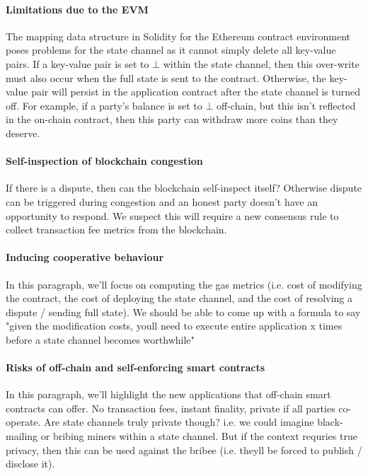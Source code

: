 \documentclass{llncs}
\begin{document}
	\paragraph{Limitations due to the EVM} 
	The mapping data structure in Solidity for the Ethereum contract environment poses problems for the state channel as it cannot simply delete all key-value pairs.
	If a key-value pair is set to $\bot$ within the state channel, then this over-write must also occur when the full state is sent to the contract. 
	Otherwise, the key-value pair will persist in the application contract after the state channel is turned off.
	For example, if a party's balance is set to $\bot$ off-chain, but this isn't reflected in the on-chain contract, then this party can withdraw more coins than they deserve. 
	
	\paragraph{Self-inspection of blockchain congestion} 
	If there is a dispute, then can the blockchain self-inspect itself? Otherwise dispute can be triggered during congestion and an honest party doesn't have an opportunity to respond.
	We suspect this will require a new consensus rule to collect transaction fee metrics from the blockchain. 
	
	\paragraph{Inducing cooperative behaviour} 
	In this paragraph, we'll focus on computing the gas metrics (i.e. cost of modifying the contract, the cost of deploying the state channel, and the cost of resolving a dispute / sending full state). We should be able to come up with a formula to say "given the modification costs, youll need to execute entire application x times before a state channel becomes worthwhile" 
	
	\paragraph{Risks of off-chain and self-enforcing smart contracts}
	In this paragraph, we'll highlight the new applications that off-chain smart contracts can offer. No transaction fees, instant finality, private if all parties co-operate. Are state channels truly private though? i.e. we could imagine black-mailing or bribing miners within a state channel. But if the context requries true privacy, then this can be used against the bribee (i.e. theyll be forced to publish / disclose it). 
	
\end{document}
